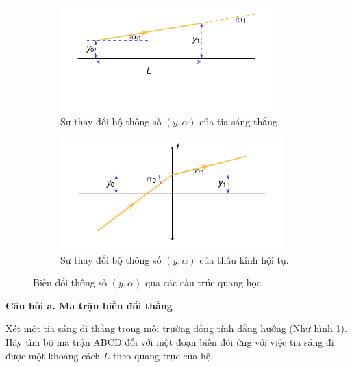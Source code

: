 \begin{figure}[!h]
    \centering
    \begin{subfigure}{0.48\textwidth}
        \centering
        \includegraphics[width=0.9\textwidth]{Problem_4/Figs_P4/Straight_light_ABCD.pdf}
        \caption{Sự thay đổi bộ thông số \( (y, \alpha) \) của tia sáng thẳng.}
        \label{fig:Straight_light_ABCD}
    \end{subfigure}
    \hspace{0.01\textwidth}
    \begin{subfigure}{0.48\textwidth}
        \centering
        \includegraphics[width=0.95\textwidth]{Problem_4/Figs_P4/Lens_ABCD.pdf}
        \caption{Sự thay đổi bộ thông số \( (y, \alpha) \) của thấu kính hội tụ.}
        \label{fig:Lens_ABCD}
    \end{subfigure}
    \caption{Biến đổi thông số \( (y, \alpha) \) qua các cấu trúc quang học.}
\end{figure}

\textbf{Câu hỏi a. Ma trận biến đổi thẳng}

Xét một tia sáng đi thẳng trong môi trường đồng tính đẳng hướng (Như hình \ref{fig:Straight_light_ABCD}). Hãy tìm bộ ma trận ABCD đối với một đoạn biến đổi ứng với việc tia sáng đi được một khoảng cách \(L\) theo quang trục của hệ.

\ \ 

